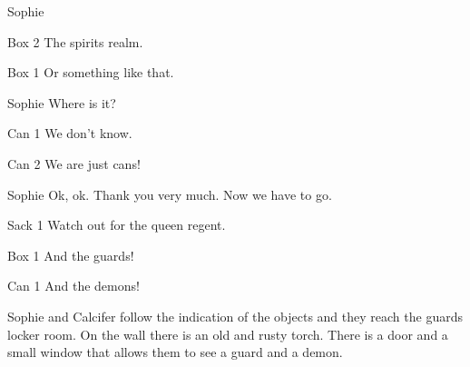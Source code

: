 \begin{screenplay}
\begin{dialogue}{Sophie}
\end{dialogue}
\begin{dialogue}{Box 2}
The spirits realm.
\end{dialogue}
\begin{dialogue}{Box 1}
Or something like that.
\end{dialogue}
\begin{dialogue}{Sophie}
Where is it?
\end{dialogue}
\begin{dialogue}{Can 1}
We don’t know.
\end{dialogue}
\begin{dialogue}{Can 2}
We are just cans!
\end{dialogue}
\begin{dialogue}{Sophie}
Ok, ok. Thank you very much. Now we have to go.
\end{dialogue}
\begin{dialogue}{Sack 1}
Watch out for the queen regent.
\end{dialogue}
\begin{dialogue}{Box 1}
And the guards!
\end{dialogue}
\begin{dialogue}{Can 1}
And the demons!
\end{dialogue}
\end{screenplay}
\vspace{1em}


Sophie and Calcifer follow the indication of the objects and they reach the guards locker room. On the wall there is an old and rusty torch. There is a door and a small window that allows them to see a guard and a demon.

